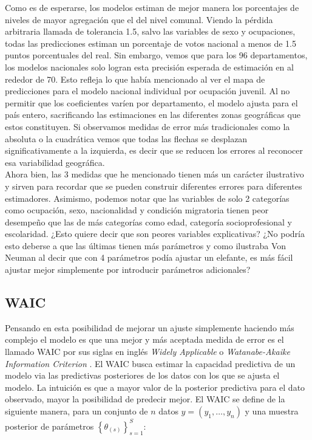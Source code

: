 Como es de esperarse, los modelos estiman de mejor manera los porcentajes de niveles de mayor agregación que el del nivel comunal. Viendo la pérdida arbitraria llamada de tolerancia 1.5, salvo las variables de sexo y ocupaciones, todas las predicciones estiman un porcentaje de votos nacional a menos de 1.5 puntos porcentuales del real. Sin embargo, vemos que para los 96 departamentos, los modelos nacionales solo logran esta precisión esperada de estimación en al rededor de 70. Esto refleja lo que había mencionado al ver el mapa de predicciones para el modelo nacional individual por ocupación juvenil. Al no permitir que los coeficientes varíen por departamento, el modelo ajusta para el país entero, sacrificando las estimaciones en las diferentes zonas geográficas que estos constituyen. Si observamos medidas de error más tradicionales como la absoluta o la cuadrática vemos que todas las flechas se desplazan significativamente a la izquierda, es decir que se reducen los errores al reconocer esa variabilidad geográfica.\\

Ahora bien, las 3 medidas que he mencionado tienen más un carácter ilustrativo y sirven para recordar que se pueden construir diferentes errores para diferentes estimadores. Asimismo, podemos notar que las variables de solo 2 categorías como ocupación, sexo, nacionalidad y condición migratoria tienen peor desempeño que las de más categorías como edad, categoría socioprofesional y escolaridad. ¿Esto quiere decir que son peores variables explicativas? ¿No podría esto deberse a que las últimas tienen más parámetros y como ilustraba Von Neuman al decir que con 4 parámetros podía ajustar un elefante, es más fácil ajustar mejor simplemente por introducir parámetros adicionales?\\

\subsection*{WAIC}

Pensando en esta posibilidad de mejorar un ajuste simplemente haciendo más complejo el modelo es que una mejor y más aceptada medida de error es el llamado WAIC por sus siglas en inglés \textit{Widely Applicable} o \textit{Watanabe-Akaike Information Criterion} \parencite{Vehtari16}. El WAIC busca estimar la capacidad predictiva de un modelo via las predictivas posteriores de los datos con los que se ajusta el modelo. La intuición es que a mayor valor de la posterior predictiva para el dato observado, mayor la posibilidad de predecir mejor. El WAIC se define de la siguiente manera, para un conjunto de $n$ datos $y=(y_1,\dots,y_n)$ y una muestra posterior de parámetros $\left\lbrace\theta_{(s)}\right\rbrace_{s=1}^S$:

